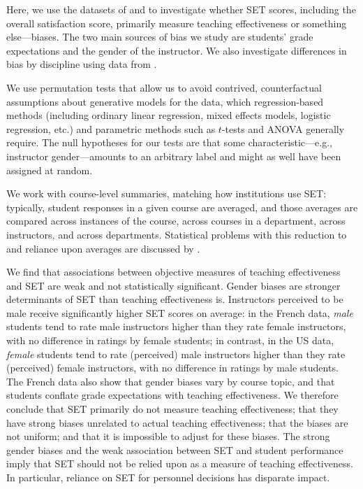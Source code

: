 \documentclass[12pt]{article}
\begin{document}
Here, we use the datasets of \citet{Boring2015} and \citet{MacNell2014} to investigate 
whether SET scores, including the overall satisfaction score, 
primarily measure teaching effectiveness or something else---biases.
The two main sources of bias we study are students' grade expectations and the gender of the 
instructor. 
We also investigate differences in bias by discipline using data from \citet{Boring2015}.

We use permutation tests that allow us to avoid 
contrived, counterfactual assumptions about
generative models for the data, which regression-based methods (including
ordinary linear regression, mixed effects models, logistic regression, etc.) and parametric
methods such as $t$-tests and ANOVA generally require.
The null hypotheses for our tests are that some 
characteristic---e.g., instructor gender---amounts to an arbitrary label and might as well
have been assigned at random. 

We work with course-level summaries, matching how institutions use SET: 
typically, student responses in a given course
are averaged, and those averages are compared across instances of the course,
across courses in a department, across instructors, and across departments.
Statistical problems with this reduction to and reliance upon averages are 
discussed by \citet{StarkFreishtat2014}.

We find that associations between objective measures of teaching effectiveness and SET are weak
and not statistically significant.
Gender biases are stronger determinants of SET than teaching effectiveness is.
Instructors perceived to be male receive significantly higher SET scores on average:
in the French data, \emph{male} students tend to rate male instructors higher
than they rate female instructors, with no difference in ratings by female students;
in contrast, in the US data, \emph{female} students tend to rate (perceived) male instructors 
higher than they rate (perceived) female instructors, with no difference in ratings by male students. 
The French data also show that gender biases vary by course topic, and 
that students conflate grade expectations with teaching effectiveness.
We therefore conclude that SET primarily do not measure teaching effectiveness; that
they have strong biases unrelated to actual teaching effectiveness; that the biases are not uniform;
and that it is impossible to adjust for these biases. 
The strong gender biases and the weak association between SET and student performance
imply that SET should not be relied upon as a measure of teaching effectiveness.
In particular, reliance on SET for personnel decisions has disparate impact. 
\end{document}

